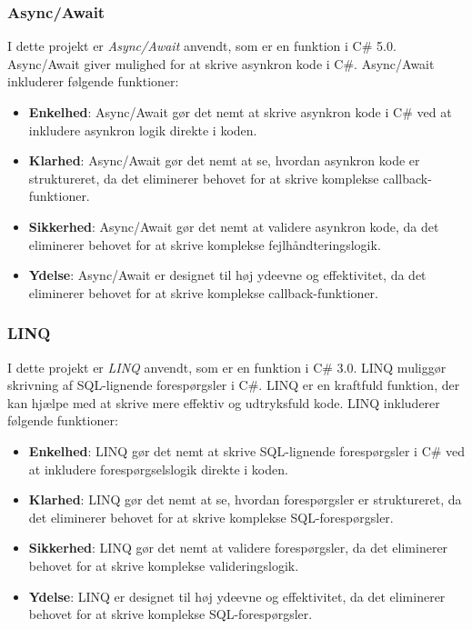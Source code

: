 \subsubsection{Async/Await}
I dette projekt er \emph{Async/Await} anvendt, som er en funktion i C\# 5.0. Async/Await giver mulighed for at skrive asynkron kode i C\#. Async/Await inkluderer følgende funktioner:
\begin{itemize}
\item \textbf{Enkelhed}: Async/Await gør det nemt at skrive asynkron kode i C\# ved at inkludere asynkron logik direkte i koden.
\item \textbf{Klarhed}: Async/Await gør det nemt at se, hvordan asynkron kode er struktureret, da det eliminerer behovet for at skrive komplekse callback-funktioner.
\item \textbf{Sikkerhed}: Async/Await gør det nemt at validere asynkron kode, da det eliminerer behovet for at skrive komplekse fejlhåndteringslogik.
\item \textbf{Ydelse}: Async/Await er designet til høj ydeevne og effektivitet, da det eliminerer behovet for at skrive komplekse callback-funktioner.
\end{itemize}

\subsubsection{LINQ}
I dette projekt er \emph{LINQ} anvendt, som er en funktion i C\# 3.0. LINQ muliggør skrivning af SQL-lignende forespørgsler i C\#. LINQ er en kraftfuld funktion, der kan hjælpe med at skrive mere effektiv og udtryksfuld kode. LINQ inkluderer følgende funktioner:
\begin{itemize}
\item \textbf{Enkelhed}: LINQ gør det nemt at skrive SQL-lignende forespørgsler i C\# ved at inkludere forespørgselslogik direkte i koden.
\item \textbf{Klarhed}: LINQ gør det nemt at se, hvordan forespørgsler er struktureret, da det eliminerer behovet for at skrive komplekse SQL-forespørgsler.
\item \textbf{Sikkerhed}: LINQ gør det nemt at validere forespørgsler, da det eliminerer behovet for at skrive komplekse valideringslogik.
\item \textbf{Ydelse}: LINQ er designet til høj ydeevne og effektivitet, da det eliminerer behovet for at skrive komplekse SQL-forespørgsler.
\end{itemize}

